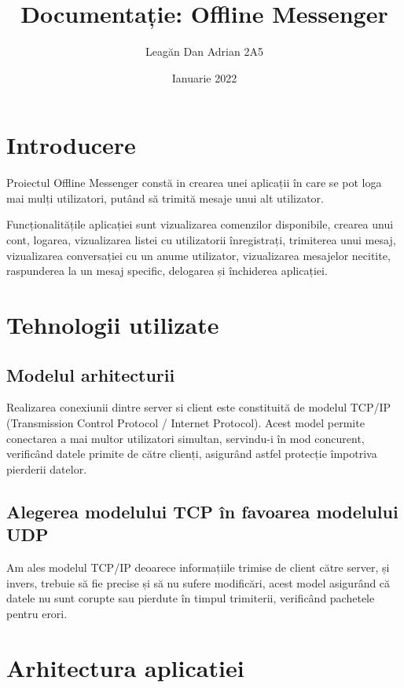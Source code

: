 \documentclass[a4paper,12pt]{article}
\title{Documentație: Offline Messenger}
\author{Leagăn Dan Adrian 2A5}
\date{Ianuarie 2022}
\begin{document}
\maketitle

\section {Introducere}

\tab
Proiectul Offline Messenger constă in crearea unei aplicații în care se pot loga mai mulți utilizatori, putând să trimită
mesaje unui alt utilizator. 

Funcționalitățile aplicației sunt vizualizarea comenzilor disponibile, crearea unui cont, logarea, vizualizarea listei cu utilizatorii înregistrați, trimiterea unui mesaj, vizualizarea conversației cu un anume utilizator, vizualizarea mesajelor necitite, raspunderea la un mesaj specific, delogarea și închiderea aplicației.
    
\section {Tehnologii utilizate}

\subsection{Modelul arhitecturii}

 \tab
 Realizarea conexiunii dintre server si client este constituită de modelul TCP/IP (Transmission Control Protocol / Internet Protocol).  Acest model permite conectarea a mai multor utilizatori simultan, servindu-i în mod concurent, verificând datele primite de către clienți, asigurând astfel protecție împotriva pierderii datelor.

\subsection{Alegerea modelului TCP în favoarea modelului UDP}
    
\tab
Am ales modelul TCP/IP deoarece informațiile trimise de client către server, și invers, trebuie să fie precise și să nu sufere modificări, acest model asigurând că datele nu sunt corupte sau pierdute în timpul trimiterii, verificând pachetele pentru erori.
    
\section {Arhitectura aplicatiei}
\end{document}
